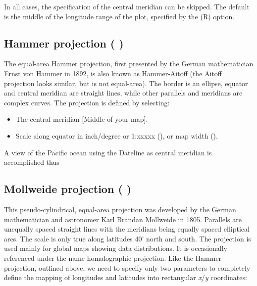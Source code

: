 In all cases, the specification of the central meridian can be skipped.
The default is the middle of the longitude range of the plot, specified by the \Opt(R) option.

\subsection{Hammer projection ( )}


The equal-area Hammer projection, first presented by the German mathematician
Ernst von Hammer in 1892, is also known as Hammer-Aitoff
(the Aitoff projection looks similar, but is not equal-area).
The border is an ellipse, equator and central meridian are
straight lines, while other parallels and meridians are
complex curves.  The projection is defined by selecting: 

\begin{itemize} 
\item The central meridian [Middle of your map].
\item Scale along equator in inch/degree or 1:xxxxx (), or map width ().
\end{itemize} 

A view of the Pacific ocean using the Dateline as central
meridian is accomplished thus



\subsection{Mollweide projection ( )}


This pseudo-cylindrical, equal-area projection was developed
by the German mathematician and astronomer Karl Brandan Mollweide in 1805.
Parallels are unequally spaced straight
lines with the meridians being equally spaced elliptical arcs.
The scale is only true along latitudes 40' north and south.
The projection is used mainly for global maps showing data
distributions.  It is occasionally referenced under the name
homalographic projection.  Like the Hammer projection,
outlined above, we need to specify only two parameters to
completely define the mapping of longitudes and latitudes
into rectangular \emph{x}/\emph{y} coordinates: 

